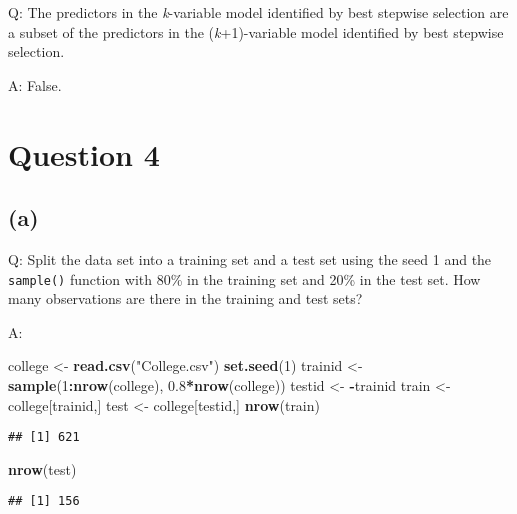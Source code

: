 \documentclass[
]{article}
\newenvironment{Shaded}{\begin{snugshade}}{\end{snugshade}}
\newcommand{\DecValTok}[1]{\textcolor[rgb]{0.00,0.00,0.81}{#1}}
\newcommand{\FloatTok}[1]{\textcolor[rgb]{0.00,0.00,0.81}{#1}}
\newcommand{\KeywordTok}[1]{\textcolor[rgb]{0.13,0.29,0.53}{\textbf{#1}}}
\newcommand{\NormalTok}[1]{#1}
\newcommand{\OperatorTok}[1]{\textcolor[rgb]{0.81,0.36,0.00}{\textbf{#1}}}
\newcommand{\StringTok}[1]{\textcolor[rgb]{0.31,0.60,0.02}{#1}}
\begin{document}
Q: The predictors in the \emph{k}-variable model identified by best
stepwise selection are a subset of the predictors in the
(\emph{k}+1)-variable model identified by best stepwise selection.

A: False.

\hypertarget{question-4}{%
\section{Question 4}\label{question-4}}

\hypertarget{a-1}{%
\subsection{(a)}\label{a-1}}

Q: Split the data set into a training set and a test set using the seed
1 and the \texttt{sample()} function with 80\% in the training set and
20\% in the test set. How many observations are there in the training
and test sets?

A:

\begin{Shaded}
\begin{Highlighting}[]
\NormalTok{college <-}\StringTok{ }\KeywordTok{read.csv}\NormalTok{(}\StringTok{"College.csv"}\NormalTok{)}
\KeywordTok{set.seed}\NormalTok{(}\DecValTok{1}\NormalTok{)}
\NormalTok{trainid <-}\StringTok{ }\KeywordTok{sample}\NormalTok{(}\DecValTok{1}\OperatorTok{:}\KeywordTok{nrow}\NormalTok{(college), }\FloatTok{0.8}\OperatorTok{*}\KeywordTok{nrow}\NormalTok{(college))}
\NormalTok{testid <-}\StringTok{ }\OperatorTok{-}\NormalTok{trainid}
\NormalTok{train <-}\StringTok{ }\NormalTok{college[trainid,]}
\NormalTok{test <-}\StringTok{ }\NormalTok{college[testid,]}
\KeywordTok{nrow}\NormalTok{(train)}
\end{Highlighting}
\end{Shaded}

\begin{verbatim}
## [1] 621
\end{verbatim}

\begin{Shaded}
\begin{Highlighting}[]
\KeywordTok{nrow}\NormalTok{(test)}
\end{Highlighting}
\end{Shaded}

\begin{verbatim}
## [1] 156
\end{verbatim}
\end{document}
